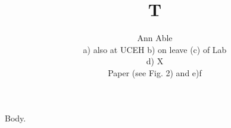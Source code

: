 \documentclass{article}
\begin{document}
\title{T}
\author{Ann Able\\ a) also at UCEH b) on leave (c) of Lab\\ d) X\\ Paper (see Fig. 2) and e)f}
\maketitle
Body.
\end{document}
